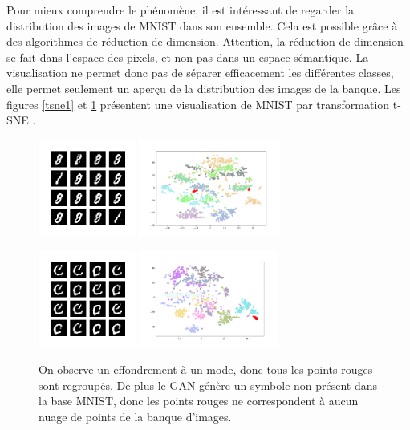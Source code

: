 Pour mieux comprendre le phénomène, il est intéressant de regarder la distribution des images de MNIST dans son ensemble. Cela est possible grâce à des algorithmes de réduction de dimension. Attention, la réduction de dimension se fait dans l'espace des pixels, et non pas dans un espace sémantique. La visualisation ne permet donc pas de séparer efficacement les différentes classes, elle permet seulement un aperçu de la distribution des images de la banque. Les figures \ref{tsne1} et \ref{tsne2} présentent une visualisation de MNIST par transformation t-SNE \cite{van_der_maaten_visualizing_2008}.

\begin{figure}[!h]
\centering
\includegraphics[height=90pt]{"images/GAN/modes1"}
\includegraphics[height=90pt]{"images/GAN/modes1_tsne"}
\caption{On observe un effondrement à deux modes. Le GAN ne génère que des chiffres 1 et des chiffres 8, correspondant aux point rouges sur la représentation t-SNE.}
\label{tsne1}
\includegraphics[height=90pt]{"images/GAN/modes2"}
\includegraphics[height=90pt]{"images/GAN/modes2_tsne"}
\caption{On observe un effondrement à un mode, donc tous les points rouges sont regroupés. De plus le GAN génère un symbole non présent dans la base MNIST, donc les points rouges ne correspondent à aucun nuage de points de la banque d'images.}
\label{tsne2}
\end{figure}

